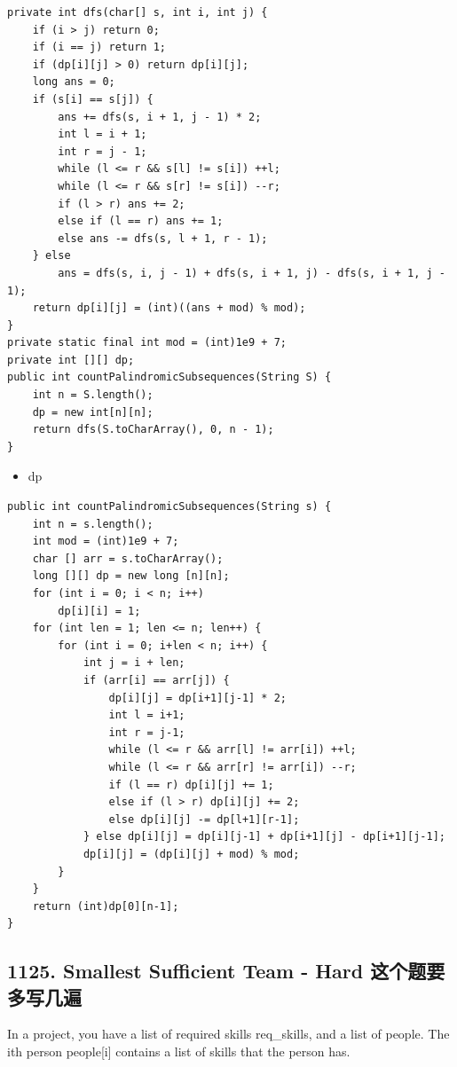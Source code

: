 \documentclass[9pt, b5paaper]{book}
\begin{document}
\begin{verbatim}
private int dfs(char[] s, int i, int j) {
    if (i > j) return 0;
    if (i == j) return 1;
    if (dp[i][j] > 0) return dp[i][j];
    long ans = 0;
    if (s[i] == s[j]) {
        ans += dfs(s, i + 1, j - 1) * 2;
        int l = i + 1;
        int r = j - 1;
        while (l <= r && s[l] != s[i]) ++l;
        while (l <= r && s[r] != s[i]) --r;
        if (l > r) ans += 2;
        else if (l == r) ans += 1;
        else ans -= dfs(s, l + 1, r - 1);
    } else 
        ans = dfs(s, i, j - 1) + dfs(s, i + 1, j) - dfs(s, i + 1, j - 1);
    return dp[i][j] = (int)((ans + mod) % mod);
}
private static final int mod = (int)1e9 + 7;
private int [][] dp;
public int countPalindromicSubsequences(String S) {
    int n = S.length();
    dp = new int[n][n];
    return dfs(S.toCharArray(), 0, n - 1);
}
\end{verbatim}
\begin{itemize}
\item dp
\end{itemize}
\begin{verbatim}
public int countPalindromicSubsequences(String s) {
    int n = s.length();
    int mod = (int)1e9 + 7;
    char [] arr = s.toCharArray();
    long [][] dp = new long [n][n];
    for (int i = 0; i < n; i++) 
        dp[i][i] = 1;
    for (int len = 1; len <= n; len++) {
        for (int i = 0; i+len < n; i++) {
            int j = i + len;
            if (arr[i] == arr[j]) {
                dp[i][j] = dp[i+1][j-1] * 2;
                int l = i+1;
                int r = j-1;
                while (l <= r && arr[l] != arr[i]) ++l;
                while (l <= r && arr[r] != arr[i]) --r;
                if (l == r) dp[i][j] += 1;
                else if (l > r) dp[i][j] += 2;
                else dp[i][j] -= dp[l+1][r-1];
            } else dp[i][j] = dp[i][j-1] + dp[i+1][j] - dp[i+1][j-1];
            dp[i][j] = (dp[i][j] + mod) % mod;
        }
    }
    return (int)dp[0][n-1];
}
\end{verbatim}

\subsection{1125. Smallest Sufficient Team - Hard 这个题要多写几遍}
\label{sec-1-4-12}
In a project, you have a list of required skills req\_skills, and a list of people. The ith person people[i] contains a list of skills that the person has.
\end{document}
